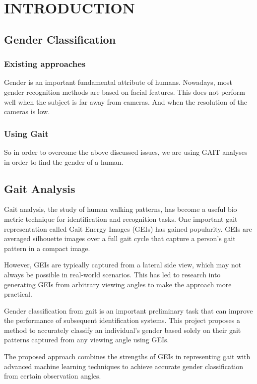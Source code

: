 \chapter{INTRODUCTION}
\graphicspath{{Chapter1/}}

\section{Gender Classification}
\subsection{Existing approaches}
Gender is an important fundamental attribute of humans. Nowadays, most gender recognition methods are based on facial features. This does not perform well when the subject is far away from cameras. And when the resolution of the cameras is low.

\subsection{Using Gait}
So in order to overcome the above discussed issues, we are using GAIT analyses in order to find the gender of a human.

\section{Gait Analysis}
Gait analysis, the study of human walking patterns, has become a useful bio metric technique for identification and recognition tasks. One important gait representation called Gait Energy Images (GEIs) has gained popularity. GEIs are averaged silhouette images over a full gait cycle that capture a person's gait pattern in a compact image. 

However, GEIs are typically captured from a lateral side view, which may not always be possible in real-world scenarios. This has led to research into generating GEIs from arbitrary viewing angles to make the approach more practical.

Gender classification from gait is an important preliminary task that can improve the performance of subsequent identification systems. This project proposes a method to accurately classify an individual's gender based solely on their gait patterns captured from any viewing angle using GEIs.

The proposed approach combines the strengths of GEIs in representing gait with advanced machine learning techniques to achieve accurate gender classification from certain observation angles.

